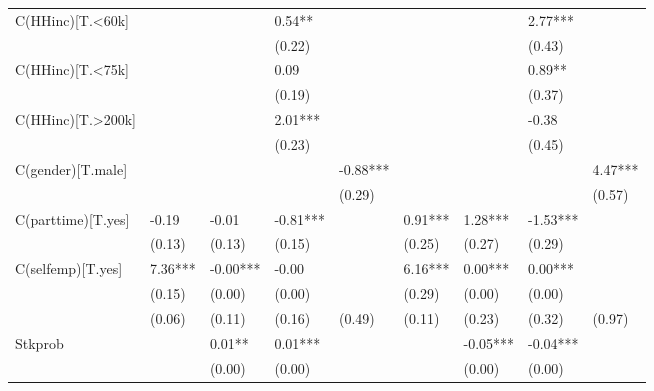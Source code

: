 \documentclass{report}
\begin{document}
\begin{table}
\begin{tabular}{lllllllll}
C(HHinc)[T.<60k]   &           &            &      0.54** &              &            &             &      2.77*** &               \\
                   &           &            &      (0.22) &              &            &             &       (0.43) &               \\
C(HHinc)[T.<75k]   &           &            &        0.09 &              &            &             &       0.89** &               \\
                   &           &            &      (0.19) &              &            &             &       (0.37) &               \\
C(HHinc)[T.>200k]  &           &            &     2.01*** &              &            &             &        -0.38 &               \\
                   &           &            &      (0.23) &              &            &             &       (0.45) &               \\
C(gender)[T.male]  &           &            &             &     -0.88*** &            &             &              &       4.47*** \\
                   &           &            &             &       (0.29) &            &             &              &        (0.57) \\
C(parttime)[T.yes] &     -0.19 &      -0.01 &    -0.81*** &              &    0.91*** &     1.28*** &     -1.53*** &               \\
                   &    (0.13) &     (0.13) &      (0.15) &              &     (0.25) &      (0.27) &       (0.29) &               \\
C(selfemp)[T.yes]  &   7.36*** &   -0.00*** &       -0.00 &              &    6.16*** &     0.00*** &      0.00*** &               \\
                   &    (0.15) &     (0.00) &      (0.00) &              &     (0.29) &      (0.00) &       (0.00) &               \\
                   &    (0.06) &     (0.11) &      (0.16) &       (0.49) &     (0.11) &      (0.23) &       (0.32) &        (0.97) \\
Stkprob            &           &     0.01** &     0.01*** &              &            &    -0.05*** &     -0.04*** &               \\
                   &           &     (0.00) &      (0.00) &              &            &      (0.00) &       (0.00) &               \\

\end{tabular}
\end{table}
\end{document}
